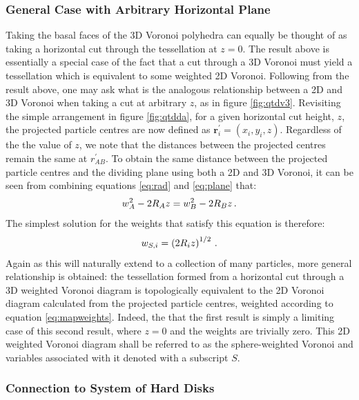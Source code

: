 \subsubsection{General Case with Arbitrary Horizontal Plane}

Taking the basal faces of the 3D Voronoi polyhedra can equally be thought of as taking a horizontal cut through the tessellation at $z=0$.
The result above is essentially a special case of the fact that a cut through a 3D Voronoi must yield a tessellation which is equivalent to some weighted 2D Voronoi\cite{Imai1985,Rivier1990}.
Following from the result above, one may ask what is the analogous relationship between a 2D and 3D Voronoi when taking a cut at arbitrary $z$, as in figure \ref{fig:qtdv3}.
Revisiting the simple arrangement in figure \ref{fig:qtdda}, for a given horizontal cut height, $z$, the projected particle centres are now defined as $\mathbf{r}_i^\prime=\left(x_i,y_i,z\right)$.
Regardless of the the value of $z$, we note that the distances between the projected centres remain the same at $r_{AB}^\prime$.
To obtain the same distance between the projected particle centres and the dividing plane using both a 2D and 3D Voronoi, it can be seen from combining equations \eqref{eq:rad} and \eqref{eq:plane} that:
\begin{equation}
	\label{eq:condition}
	w_A^2-2R_Az = w_B^2-2R_Bz\,.
\end{equation}
The simplest solution for the weights that satisfy this equation is therefore:
\begin{equation}
	\label{eq:mapweights}
	w_{S,i} = \left(2R_iz\right)^{1/2}\,.
\end{equation}
Again as this will naturally extend to a collection of many particles, more general relationship is obtained: the tessellation formed from a horizontal cut through a 3D weighted Voronoi diagram is topologically equivalent to the 2D Voronoi diagram calculated from the projected particle centres, weighted according to equation \eqref{eq:mapweights}.
Indeed, the that the first result is simply a limiting case of this second result, where $z=0$ and the weights are trivially zero.
This 2D weighted Voronoi diagram shall be referred to as the sphere\--weighted Voronoi and variables associated with it denoted with a subscript $S$.

\subsubsection{Connection to System of Hard Disks}

